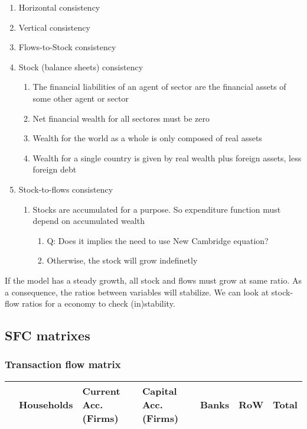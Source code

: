 \documentclass[11pt]{article}
\begin{document}
\begin{enumerate}
\item Horizontal consistency
\item Vertical consistency
\item Flows-to-Stock consistency
\item Stock (balance sheets) consistency
\begin{enumerate}
\item The financial liabilities of an agent of sector are the financial assets of some other agent or sector
\item Net financial wealth for all sectores must be zero
\item Wealth for the world as a whole is only composed of real assets
\item Wealth for a single country is given by real wealth plus foreign assets, less foreign debt
\end{enumerate}
\item Stock-to-flows consistency
\begin{enumerate}
\item Stocks are accumulated for a purpose. So expenditure function must depend on accumulated wealth
\begin{enumerate}
\item Q: Does it implies the need to use New Cambridge equation?
\item Otherwise, the stock will grow indefinetly
\end{enumerate}
\end{enumerate}
\end{enumerate}

If the model has a steady growth, all stock and flows must grow at same ratio.
As a consequence, the ratios between variables will stabilize.
We can look at stock-flow ratios for a economy to check (in)stability.

\subsection*{SFC matrixes}
\label{sec:org6165169}


\subsubsection*{Transaction flow matrix}
\label{sec:org75fcd6e}

\begin{center}
\begin{tabular}{lllllll}
 & Households & Current Acc. (Firms) & Capital Acc. (Firms) & Banks & RoW & Total\\
\hline
\end{tabular}

\end{center}
\end{document}
